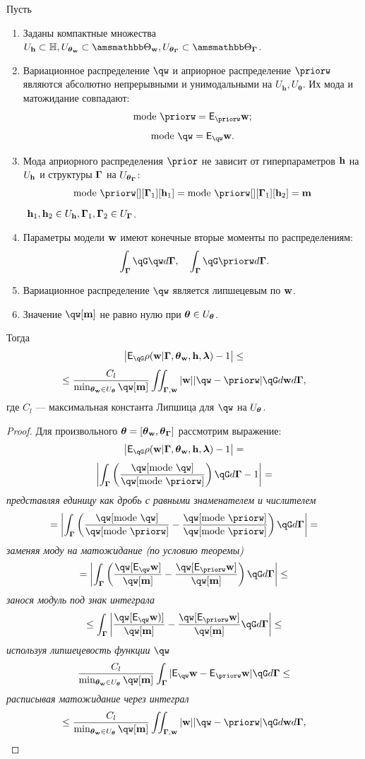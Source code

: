 \begin{lemma}
\label{lem:cp_bound}
Пусть
\begin{enumerate}

\item Заданы компактные множества $\Uh \subset \Hb, \Utetaw \subset \Tetawb, \UtetaG \subset \TetaGb$.

\item Вариационное распределение $\qw$ и априорное распределение $\priorw$  являются абсолютно непрерывными и унимодальными на  $U_\mathbf{h}, U_{\boldsymbol{\theta}}$.
Их мода и матожидание совпадают:
\[
    \text{mode}~\priorw= \E_{\priorw} \w;
\]
\[
  \text{mode}~\qw = \E_{\qw} \w.
\]




\item Мода априорного распределения $\prior$ не зависит от гиперпараметров $\mathbf{h}$  на $U_{\mathbf{h}}$ и структуры $\boldsymbol{\Gamma}$ на $U_{\boldsymbol{\theta}_{\boldsymbol{\Gamma}}}$:
\[
\text{mode}~\priorw[][\G_1][\h_1]=\text{mode}~\priorw[][\G_1][\h_2]=\mathbf{m}
\]
$~\mathbf{h}_1,\mathbf{h}_2 \in U_{\mathbf{h}}, \boldsymbol{\Gamma}_1,\boldsymbol{\Gamma}_2 \in U_{\boldsymbol{\Gamma}}$.

\item Параметры модели $\mathbf{w}$ имеют конечные вторые моменты по распределениям:
\[
   \int_{\G}\qG\qw d\G, \quad \int_{\G}\qG\priorw d\G.
\]


\item Вариационное распределение $\qw$ является липшецевым по $\mathbf{w}$.

\item Значение $\qw[\mathbf{m}]$ не равно нулю при $\boldsymbol{\theta} \in U_{\boldsymbol{\theta}}$.
\end{enumerate}
Тогда 
\[
   \left|\E_{\qG} {\rho}(\w|\G, \tetaw, \h, \lam) - 1\right| \leq
\]
\[
\leq \frac{C_l}{\min_{\tetaw \in \Uteta} \qw[\mathbf{m}]} \iint_{\G,\w} |\w| |\qw - \priorw|\qG d\w d\G,
\]
где $C_l$ --- максимальная константа Липшица для $\qw$ на $U_{\boldsymbol{\theta}}$.

\end{lemma}
\begin{proof}
Для произвольного $\boldsymbol{\theta}=[\boldsymbol{\theta}_\mathbf{w}, \boldsymbol{\theta}_{\boldsymbol{\Gamma}}]$ рассмотрим выражение:
\[
   \left|\E_{\qG} {\rho}(\w|\G, \tetaw, \h, \lam) - 1\right| =
\]
\[
   \left|\int_{\G} \left(\frac{\qw[\text{mode}~\qw]}{\qw[\text{mode}~\priorw]} \right)\qG d\G  - 1 \right| =
\]
\textit{представляя единицу как дробь с равными знаменателем и числителем}
\[
 =  \left|\int_{\G} \left(\frac{\qw[\text{mode}~\qw]}{\qw[\text{mode}~\priorw]} -  \frac{\qw[\text{mode}~\priorw]}{\qw[\text{mode}~\priorw]} \right)\qG d\G \right| =
\]
\textit{заменяя моду на матожидание (по условию теоремы)}
\[  = \left|\int_{\G} \left( \frac{\qw[\E_{\qw}\w]}{\qw[\mathbf{m}]} -  \frac{\qw[\E_{\priorw} \w]}{\qw[\mathbf{m}]} \right) \qG d\G\right| \leq 
\]
\textit{занося модуль под знак интеграла}
\[
\leq 
\int_{\G} \left|\frac{\qw[\E_{\qw} \w)]}{{\qw[\mathbf{m}]}} -   \frac{\qw[\E_{\priorw} \w]}{\qw[\mathbf{m}]}\qG d\G\right| \leq
\]
\textit{используя липшецевость функции }$\qw$
\[
\frac{C_l}{\min_{\tetaw \in \Uteta} \qw[\mathbf{m}]}\int_{\G}  |\E_{\qw}\w - \E_{\priorw}\w|\qG d\G  \leq
\]
\textit{расписывая матожидание через интеграл}
\[
    \leq \frac{C_l}{\min_{\tetaw \in \Uteta} \qw[\mathbf{m}]} \iint_{\G,\w} |\w| |\qw - \priorw|\qG d\w d\G,
\] 
\end{proof}
